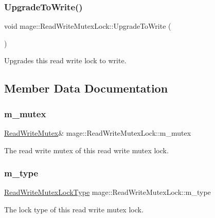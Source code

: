 \subsubsection{\texorpdfstring{Upgrade\+To\+Write()}{UpgradeToWrite()}}
{\footnotesize\ttfamily void mage\+::\+Read\+Write\+Mutex\+Lock\+::\+Upgrade\+To\+Write (\begin{DoxyParamCaption}{ }\end{DoxyParamCaption})}

Upgrades this read write lock to write. 

\subsection{Member Data Documentation}
\hypertarget{structmage_1_1_read_write_mutex_lock_a6ee9034fa984e11ec07c20ec77ab1bfe}{}\label{structmage_1_1_read_write_mutex_lock_a6ee9034fa984e11ec07c20ec77ab1bfe} 
\subsubsection{\texorpdfstring{m\+\_\+mutex}{m\_mutex}}
{\footnotesize\ttfamily \hyperlink{classmage_1_1_read_write_mutex}{Read\+Write\+Mutex}\& mage\+::\+Read\+Write\+Mutex\+Lock\+::m\+\_\+mutex\hspace{0.3cm}{\ttfamily [private]}}

The read write mutex of this read write mutex lock. \hypertarget{structmage_1_1_read_write_mutex_lock_aa117ffe94f6850ddc91ad6d1389fb6e2}{}\label{structmage_1_1_read_write_mutex_lock_aa117ffe94f6850ddc91ad6d1389fb6e2} 
\subsubsection{\texorpdfstring{m\+\_\+type}{m\_type}}
{\footnotesize\ttfamily \hyperlink{namespacemage_afd76fcca37ce5c5b2227671290973c74}{Read\+Write\+Mutex\+Lock\+Type} mage\+::\+Read\+Write\+Mutex\+Lock\+::m\+\_\+type\hspace{0.3cm}{\ttfamily [private]}}

The lock type of this read write mutex lock. 